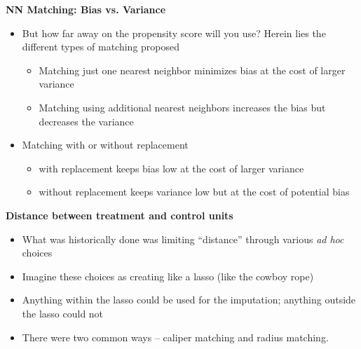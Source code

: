 \documentclass[notes=show]{beamer}
\begin{document}
\begin{frame}[plain]
	
	\begin{center}
	\textbf{NN Matching: Bias vs. Variance}
	\end{center}
	
	\begin{itemize}
	\item But how far away on the propensity score will you use? Herein lies the different types of matching proposed
		\begin{itemize}
		\item Matching just one nearest neighbor minimizes bias at the cost of larger variance
		\item Matching using additional nearest neighbors increases the bias but decreases the variance
		\end{itemize}
	\item Matching with or without replacement
		\begin{itemize}
		\item with replacement keeps bias low at the cost of larger variance
		\item without replacement keeps variance low but at the cost of potential bias
		\end{itemize}
	\end{itemize}
	
\end{frame}


\begin{frame}[plain]
\begin{center}
\textbf{Distance between treatment and control units}
\end{center}

\begin{itemize}
\item What was historically done was limiting ``distance''  through various \emph{ad hoc} choices
\item Imagine these choices as creating like a lasso (like the cowboy rope)
\item Anything within the lasso could be used for the imputation; anything outside the lasso could not
\item There were two common ways -- caliper matching and radius matching. 
\end{itemize}

\end{frame}
\end{document}
